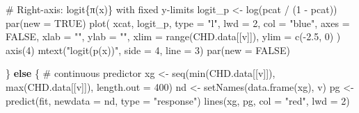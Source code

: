 \documentclass[
  letterpaper,
]{scrbook}
\newenvironment{Shaded}{\begin{snugshade}}{\end{snugshade}}
\newcommand{\AttributeTok}[1]{\textcolor[rgb]{0.40,0.45,0.13}{#1}}
\newcommand{\CommentTok}[1]{\textcolor[rgb]{0.37,0.37,0.37}{#1}}
\newcommand{\ConstantTok}[1]{\textcolor[rgb]{0.56,0.35,0.01}{#1}}
\newcommand{\ControlFlowTok}[1]{\textcolor[rgb]{0.00,0.23,0.31}{\textbf{#1}}}
\newcommand{\DecValTok}[1]{\textcolor[rgb]{0.68,0.00,0.00}{#1}}
\newcommand{\FloatTok}[1]{\textcolor[rgb]{0.68,0.00,0.00}{#1}}
\newcommand{\FunctionTok}[1]{\textcolor[rgb]{0.28,0.35,0.67}{#1}}
\newcommand{\NormalTok}[1]{\textcolor[rgb]{0.00,0.23,0.31}{#1}}
\newcommand{\OtherTok}[1]{\textcolor[rgb]{0.00,0.23,0.31}{#1}}
\newcommand{\SpecialCharTok}[1]{\textcolor[rgb]{0.37,0.37,0.37}{#1}}
\newcommand{\StringTok}[1]{\textcolor[rgb]{0.13,0.47,0.30}{#1}}
\begin{document}
\begin{Shaded}
\begin{Highlighting}[]
    \CommentTok{\# Right{-}axis: logit\{π(x)\} with fixed y{-}limits}
\NormalTok{    logit\_p }\OtherTok{\textless{}{-}} \FunctionTok{log}\NormalTok{(pcat }\SpecialCharTok{/}\NormalTok{ (}\DecValTok{1} \SpecialCharTok{{-}}\NormalTok{ pcat))}
    \FunctionTok{par}\NormalTok{(}\AttributeTok{new =} \ConstantTok{TRUE}\NormalTok{)}
    \FunctionTok{plot}\NormalTok{(}
\NormalTok{      xcat, logit\_p, }\AttributeTok{type =} \StringTok{"l"}\NormalTok{, }\AttributeTok{lwd =} \DecValTok{2}\NormalTok{, }\AttributeTok{col =} \StringTok{"blue"}\NormalTok{,}
      \AttributeTok{axes =} \ConstantTok{FALSE}\NormalTok{, }\AttributeTok{xlab =} \StringTok{""}\NormalTok{, }\AttributeTok{ylab =} \StringTok{""}\NormalTok{,}
      \AttributeTok{xlim =} \FunctionTok{range}\NormalTok{(CHD.data[[v]]), }\AttributeTok{ylim =} \FunctionTok{c}\NormalTok{(}\SpecialCharTok{{-}}\FloatTok{2.5}\NormalTok{, }\DecValTok{0}\NormalTok{)}
\NormalTok{    )}
    \FunctionTok{axis}\NormalTok{(}\DecValTok{4}\NormalTok{)}
    \FunctionTok{mtext}\NormalTok{(}\StringTok{"logit(p(x))"}\NormalTok{, }\AttributeTok{side =} \DecValTok{4}\NormalTok{, }\AttributeTok{line =} \DecValTok{3}\NormalTok{)}
    \FunctionTok{par}\NormalTok{(}\AttributeTok{new =} \ConstantTok{FALSE}\NormalTok{)}

\NormalTok{  \} }\ControlFlowTok{else}\NormalTok{ \{}
    \CommentTok{\# continuous predictor}
\NormalTok{    xg }\OtherTok{\textless{}{-}} \FunctionTok{seq}\NormalTok{(}\FunctionTok{min}\NormalTok{(CHD.data[[v]]), }\FunctionTok{max}\NormalTok{(CHD.data[[v]]), }\AttributeTok{length.out =} \DecValTok{400}\NormalTok{)}
\NormalTok{    nd }\OtherTok{\textless{}{-}} \FunctionTok{setNames}\NormalTok{(}\FunctionTok{data.frame}\NormalTok{(xg), v)}
\NormalTok{    pg }\OtherTok{\textless{}{-}} \FunctionTok{predict}\NormalTok{(fit, }\AttributeTok{newdata =}\NormalTok{ nd, }\AttributeTok{type =} \StringTok{"response"}\NormalTok{)}
    \FunctionTok{lines}\NormalTok{(xg, pg, }\AttributeTok{col =} \StringTok{"red"}\NormalTok{, }\AttributeTok{lwd =} \DecValTok{2}\NormalTok{)}


\end{Highlighting}
\end{Shaded}
\end{document}
